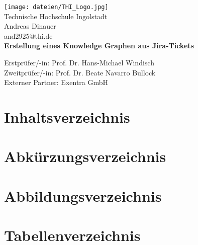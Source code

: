 \documentclass[10pt]{article}
\begin{document}
\renewcommand\thesection{\Roman{section}}
\begin{titlepage}
    \begin{center}
        \texttt{[image: dateien/THI\_Logo.jpg]} \\
        \vspace{0.5cm}
        Technische Hochschule Ingolstadt\\
        \vspace{1cm}
        \normalsize
        Andreas Dinauer\\
        and2925@thi.de\\
        
        \vspace*{0.5cm}
        \LARGE
        \textbf{Erstellung eines Knowledge Graphen aus Jira-Tickets}
            
        \vspace{1cm}
        \normalsize
        Erstprüfer/-in: Prof. Dr. Hans-Michael Windisch \\
        Zweitprüfer/-in: Prof. Dr. Beate Navarro Bullock \\
        \vspace{1cm}
        \normalsize
        Externer Partner: Exentra GmbH
            
    \end{center}
\end{titlepage}

\newpage

\section{Inhaltsverzeichnis}
\newpage
\section{Abkürzungsverzeichnis}
\newpage
\section{Abbildungsverzeichnis}
\newpage
\section{Tabellenverzeichnis}
\newpage
\setcounter{section}{0}
\renewcommand\thesection{\arabic{section}}
\end{document}
